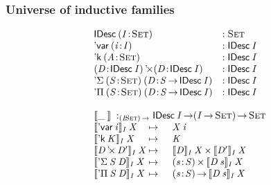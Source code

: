 \documentclass{beamer}
\begin{document}
\begin{frame}

\frametitle{Universe of inductive families}

\[\stk{\begin{array}{@{}ll}
\IDesc{(\Bhab{\V{I}}{\Set})} 
    &: \Set \\
\DVar{(\Bhab{\V{i}}{\V{I}})} 
    &: \IDesc{\V{I}} \\
\DConst{(\Bhab{\V{A}}{\Set})} 
    &: \IDesc{\V{I}}       \\
\DProd{(\Bhab{\V{D}}{\IDesc{\V{I}}})}{(\Bhab{\V{D}}{\IDesc{\V{I}}})}
    &: \IDesc{\V{I}}       \\
\DSigma{(\Bhab{\V{S}}{\Set})}{(\Bhab{\V{D}}{\V{S}\To\IDesc{\V{I}}})}
    &: \IDesc{\V{I}}  \\
\DPi{(\Bhab{\V{S}}{\Set})}{(\Bhab{\V{D}}{\V{S}\To\IDesc{\V{I}}})}
    &: \IDesc{\V{I}}  \\
\end{array}
\\
\\
\idescop{\_\:}{}{} :_{\PI{\V{I}}{\Set}} \IDesc{\V{I}} \To (\V{\V{I}} \To \Set) \To \Set                  \\
\begin{array}{@{}l@{\:\mapsto\:\:}ll}
\idescop{\DVar{\V{i}}}{\V{I}}{\V{X}&}      &  \V{X}\: \V{i}                                           \\
\idescop{\DConst{\V{K}}}{\V{I}}{\V{X}&}    &  \V{K}                                                   \\
\idescop{\DProd{\V{D}}{\V{D'}}}{\V{I}}{\V{X}&} &  \TIMES{\idescop{\V{D}}{\V{I}}{\V{X}}}{\idescop{\V{D'}}{\V{I}}{\V{X}}}       \\
\idescop{\DSigma{\V{S}}{\V{D}}}{\V{I}}{\V{X}&} &  \SIGMA{\V{s}}{\V{S}} \idescop{\V{D}\: \V{s}}{\V{I}}{\V{X}}                    \\
\idescop{\DPi{\V{S}}{\V{D}}}{\V{I}}{\V{X}&}    &  \PI{\V{s}}{\V{S}} \idescop{\V{D}\: \V{s}}{\V{I}}{\V{X}}            
\end{array}
}\]


\end{frame}
\end{document}
